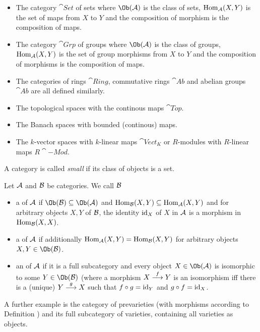 \documentclass[a4paper,parskip=half,numbers=enddot, DIV=12]{scrreprt}
\begin{document}
\begin{example}
    \begin{itemize}
        \item 
            The category $\cat{Set}$ of sets where $\Ob(\Aa)$ is the class of sets, $\operatorname{Hom}_{\mathcal{A}}(X,Y)$ is the set of maps from $X$ to $Y$ and the composition of morphism is the composition of maps.
        \item 
            The category $\cat{Grp}$ of groups where $\Ob(\Aa)$ is the class of groups, $\operatorname{Hom}_{\mathcal{A}}(X,Y)$ is the set of group morphisms from $X$ to $Y$ and the composition of morphisms is the composition of maps.
        \item 
            The categories of rings $\cat{Ring}$, commutative rings $\cat{Ab}$ and abelian groups $\cat{Ab}$ are all defined similarly.
        \item 
            The topological spaces with the continous maps $\cat{Top}$.
        \item 
            The Banach spaces with bounded (continous) maps.
        \item 
            The $k$-vector spaces with $k$-linear maps $\cat{Vect}_K$ or $R$-modules with $R$-linear maps $R\cat{-Mod}$.
    \end{itemize}
\end{example}
A category is called \emph{small} if its class of objects is a set.

\begin{defi}
	Let $\mathcal{A}$ and $\mathcal{B}$ be categories. We call $\mathcal{B}$
	\begin{itemize}
		\item a  of $\mathcal{A}$ if $\Ob(\Bb) \subseteq \Ob(\Aa)$ and $\operatorname{Hom}_{\mathcal{B}}(X,Y) \subseteq \operatorname{Hom}_{\mathcal{A}}(X,Y)$ and for arbitrary objects $X,Y$ of $\mathcal{B}$, the identity $\operatorname{id}_X$ of $X$ in $\mathcal{A}$ is a morphism in $\operatorname{Hom}_{\mathcal{B}}(X,X)$.
		\item a  of $\mathcal{A}$ if additionally $\operatorname{Hom}_{\mathcal{A}}(X,Y) = \operatorname{Hom}_{\mathcal{B}}(X,Y)$ for arbitrary objects $X,Y\in\Ob(\Bb)$.
		\item an  of $\mathcal{A}$ if it is a full subcategory and every object $X\in \Ob(\Aa)$ is isomorphic to some $Y\in\Ob(\Bb)$ (where a morphism $X\morphism[f] Y$ is an isomorphism iff there  is a (unique) $Y\morphism[g] X$ such that $f\circ g = \operatorname{id}_Y$ and $g\circ f= \operatorname{id}_X$.
	\end{itemize}
\end{defi}

  A further example is the category of prevarieties (with morphisms according to Definition ) and its full subcategory of varieties, containing all varieties as objects.
  
\end{document}
